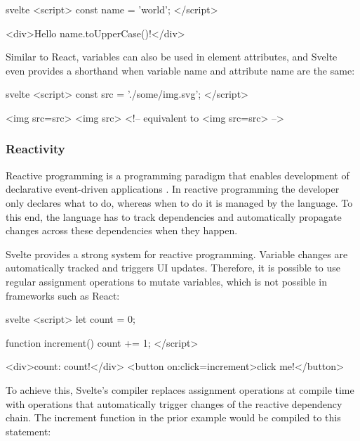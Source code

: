 
\begin{myminted}{svelte}{}
<script>
  const name = 'world';
</script>

<div>Hello {name.toUpperCase()}!</div>
\end{myminted}

Similar to React, variables can also be used in element attributes, and Svelte even provides a shorthand when variable name and attribute name are the same:
\begin{myminted}{svelte}{}
<script>
  const src = './some/img.svg';
</script>

<img src={src}>
<img {src}> <!-- equivalent to <img src={src}> -->
\end{myminted}

\subsubsection{Reactivity}
\label{sec:svelte-reactivity}

Reactive programming is a programming paradigm that enables development of declarative event-driven applications \cite{bainomugisha_survey_2013}. In reactive programming the developer only declares what to do, whereas when to do it is managed by the language. To this end, the language has to track dependencies and automatically propagate changes across these dependencies when they happen.

Svelte provides a strong system for reactive programming. Variable changes are automatically tracked and triggers UI updates. Therefore, it is possible to use regular assignment operations to mutate variables, which is not possible in frameworks such as React:

\begin{myminted}{svelte}{}
<script>
  let count = 0;

  function increment() {
    count += 1;
  }
</script>

<div>count: {count}!</div>
<button on:click={increment}>click me!</button>
\end{myminted}

To achieve this, Svelte's compiler replaces assignment operations at compile time with operations that automatically trigger changes of the reactive dependency chain. The increment function in the prior example would be compiled to this statement:

